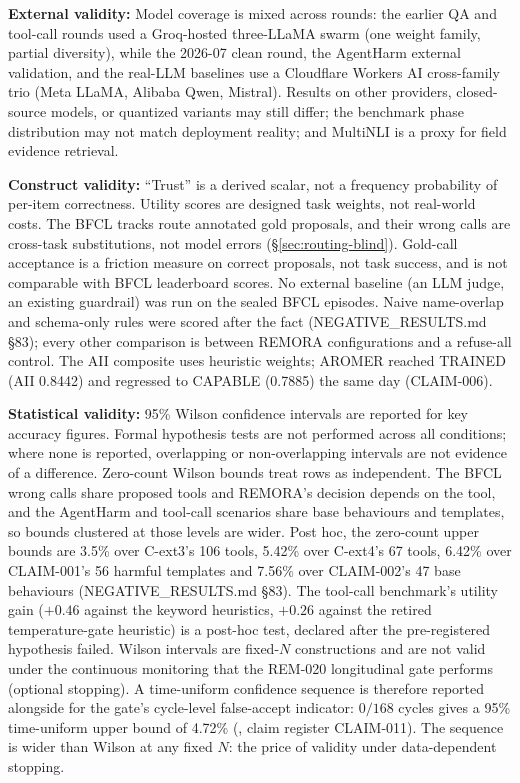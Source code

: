 \documentclass[10pt,twocolumn]{article}
\begin{document}
\textbf{External validity:} Model coverage is mixed across rounds: the
earlier QA and tool-call rounds used a Groq-hosted three-LLaMA swarm
(one weight family, partial diversity), while the 2026-07 clean round,
the AgentHarm external validation, and the real-LLM baselines use a
Cloudflare Workers AI cross-family trio (Meta LLaMA, Alibaba Qwen,
Mistral). Results on other providers, closed-source models, or quantized
variants may still differ; the benchmark phase distribution may not match
deployment reality; and MultiNLI is a proxy for field evidence retrieval.

\textbf{Construct validity:} ``Trust'' is a derived scalar, not a frequency probability
of per-item correctness. Utility scores are designed task weights, not
real-world costs. The BFCL tracks route annotated gold proposals, and their
wrong calls are cross-task substitutions, not model errors
(\S\ref{sec:routing-blind}). Gold-call acceptance is a friction measure on
correct proposals, not task success, and is not comparable with BFCL
leaderboard scores. No external baseline (an LLM judge, an existing
guardrail) was run on the sealed BFCL episodes. Naive name-overlap and
schema-only rules were scored after the fact (NEGATIVE\_RESULTS.md \S83);
every other comparison is between REMORA configurations and a refuse-all
control. The
AII composite uses heuristic weights; AROMER reached TRAINED (AII 0.8442)
and regressed to CAPABLE (0.7885) the same day (CLAIM-006).

\textbf{Statistical validity:} 95\% Wilson confidence intervals are
reported for key accuracy figures. Formal hypothesis tests are not performed
across all conditions; where none is reported, overlapping or
non-overlapping intervals are not evidence of a difference. Zero-count
Wilson bounds treat rows as independent. The BFCL wrong calls share
proposed tools and REMORA's decision depends on the tool, and the AgentHarm
and tool-call scenarios share base behaviours and templates, so bounds
clustered at those levels are wider. Post hoc, the zero-count upper
bounds are 3.5\% over C-ext3's 106 tools, 5.42\% over C-ext4's 67 tools,
6.42\% over CLAIM-001's 56 harmful templates and 7.56\% over CLAIM-002's 47
base behaviours (NEGATIVE\_RESULTS.md \S83). The
tool-call benchmark's utility gain ($+0.46$ against the keyword
heuristics, $+0.26$ against the retired temperature-gate heuristic) is
a post-hoc test, declared
after the pre-registered hypothesis failed. Wilson intervals are fixed-$N$
constructions and are not valid under the continuous monitoring that the
REM-020 longitudinal gate performs (optional stopping). A time-uniform
confidence sequence
\cite{ville1939etude,darling1967confidence,howard2021timeuniform,ramdas2023game}
is therefore reported alongside for the gate's cycle-level false-accept
indicator: $0/168$ cycles gives a 95\% time-uniform upper bound of
4.72\% (, claim register
CLAIM-011). The sequence is wider than Wilson at any fixed $N$: the
price of validity under data-dependent stopping.
\end{document}
